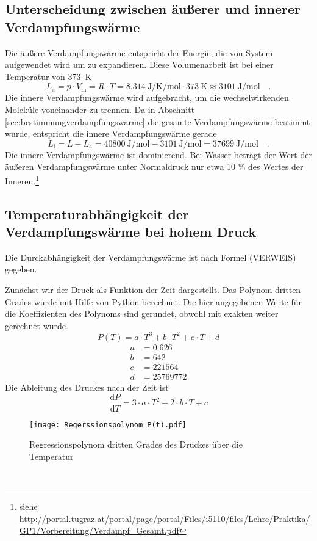 \subsection{Unterscheidung zwischen äußerer und innerer Verdampfungswärme}
Die äußere Verdampfungswärme entspricht der Energie, die von System aufgewendet wird um zu expandieren. Diese Volumenarbeit ist bei einer Temperatur von  \SI{373}{\kelvin}
\begin{equation}
L_\text{a} = p \cdot V_\text{m} = R \cdot T = \SI{8.314}{\joule\per\kelvin\per\mol} \cdot  \SI{373}{\kelvin} \approx \SI{3101}{\joule\per\mol} \quad.
\end{equation}
Die innere Verdampfungswärme wird aufgebracht, um die wechselwirkenden Moleküle voneinander zu trennen. Da in Abschnitt \ref{sec:bestimmungverdampfungswarme} die gesamte Verdampfungswärme bestimmt wurde, entspricht die innere Verdampfungswärme gerade
\begin{equation}
L_\text{i} = L - L_{\text{a}} = \SI{40800}{\joule\per\mol} - \SI{3101}{\joule\per\mol} = \SI{37699}{\joule\per\mol} \quad.
\end{equation}
Die innere Verdampfungswärme ist dominierend. Bei Wasser beträgt der Wert der äußeren Verdampfungswärme unter Normaldruck nur etwa 10 \% des Wertes der Inneren.\footnote{siehe \url{http://portal.tugraz.at/portal/page/portal/Files/i5110/files/Lehre/Praktika/GP1/Vorbereitung/Verdampf_Gesamt.pdf}}




\subsection{Temperaturabhängigkeit der Verdampfungswärme bei hohem Druck}
Die Durckabhängigkeit der Verdampfungswärme ist nach Formel (VERWEIS) gegeben.

Zunächst wir der Druck als Funktion der Zeit dargestellt. Das Polynom dritten Grades wurde mit Hilfe von Python berechnet. Die hier angegebenen Werte für die Koeffizienten des Polynoms sind gerundet, obwohl mit exakten weiter gerechnet wurde.
\begin{equation}
P(T) = a \cdot T ^3 + b \cdot T^2 +c \cdot T + d
\end{equation}
\begin{align}
a &=0.626 \\
b &= 642 \\
c &= 221564 \\
d  &= 25769772
\end{align}
Die Ableitung des Druckes nach der Zeit ist
\begin{equation}
\frac{\text{d} P}{\text{d} T} = 3 \cdot a \cdot T^2 + 2 \cdot b \cdot T + c
\end{equation}
\begin{figure}[h!]
	\centering
	\texttt{[image: Regerssionspolynom\_P(t).pdf]}
	\caption{Regressionspolynom dritten Grades des Druckes über die Temperatur}
	\label{fig:Regerssionspolynom_P(t)}
\end{figure}
\\

